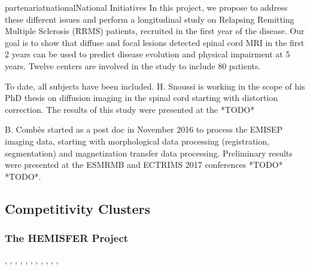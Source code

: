 \documentclass{ra2018}
\begin{document}
\begin{module}{partenariat}{national}{National Initiatives}
In this project, we propose to address these different issues and perform a
longitudinal study on Relapsing Remitting Multiple Sclerosis (RRMS) patients,
recruited in the first year of the disease. Our goal is to show that diffuse
and focal lesions detected spinal cord MRI in the first 2 years can be used to
predict disease evolution and physical impairment at 5 years. Twelve centers
are involved in the study to include 80 patients. 

To date, all subjects have been included. H. Snoussi is working in the
scope of his PhD thesis on diffusion imaging in the spinal cord starting with distortion correction. The results of this study were presented at the *TODO*

B. Combès started as a post doc in November 2016 to process the EMISEP imaging data, starting with
morphological data processing (registration, segmentation) and magnetization
transfer data processing. Preliminary results were presented at the ESMRMB and ECTRIMS 2017 conferences *TODO* *TODO*. 

        \subsection{Competitivity Clusters}
        
        \subsubsection{The HEMISFER Project}
        \begin{participants}
          , 
          ,
          , 
          ,
          ,
          , 
          , 
          ,
          ,
          ,
          ,
        \end{participants}	
        

\end{module}
\end{document}
